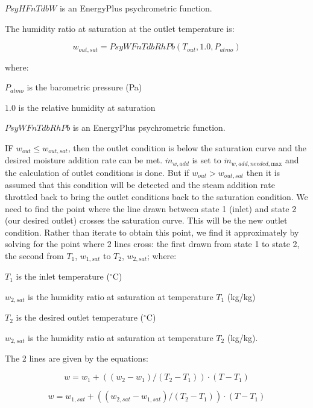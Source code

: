 \(PsyHFnTdbW\) is an EnergyPlus psychrometric function.

The humidity ratio at saturation at the outlet temperature is:

\begin{equation}
{w_{out,sat}} = PsyWFnTdbRhPb({T_{out}},1.0,{P_{atmo}})
\end{equation}

where:

\({P_{atmo}}\) is the barometric pressure (Pa)

\(1.0\) is the relative humidity at saturation

\(PsyWFnTdbRhPb\) is an EnergyPlus psychrometric function.

IF \({w_{out}} \le {w_{out,sat}}\), then the outlet condition is below the saturation curve and the desired moisture addition rate can be met. \({\dot m_{w,add}}\) is set to \({\dot m_{w,add,needed,{\mathrm{max}}}}\) and the calculation of outlet conditions is done. But if \({w_{out}} > {w_{out,sat}}\) then it is assumed that this condition will be detected and the steam addition rate throttled back to bring the outlet conditions back to the saturation condition. We need to find the point where the line drawn between state 1 (inlet) and state 2 (our desired outlet) crosses the saturation curve. This will be the new outlet condition. Rather than iterate to obtain this point, we find it approximately by solving for the point where 2 lines cross: the first drawn from state 1 to state 2, the second from \({T_1}\), \({w_{1,sat}}\) to \({T_2}\), \({w_{2,sat}}\); where:

\({T_1}\) is the inlet temperature (\(^{\circ}\)C)

\({w_{2,sat}}\) is the humidity ratio at saturation at temperature \({T_1}\) (kg/kg)

\({T_2}\) is the desired outlet temperature (\(^{\circ}\)C)

\({w_{2,sat}}\) is the humidity ratio at saturation at temperature \({T_2}\) (kg/kg).

The 2 lines are given by the equations:

\begin{equation}
w = {w_1} + (({w_2} - {w_1})/({T_2} - {T_1})) \cdot (T - {T_1})
\end{equation}

\begin{equation}
w = {w_{1,sat}} + (({w_{2,sat}} - {w_{1,sat}})/({T_2} - {T_1})) \cdot (T - {T_1})
\end{equation}

